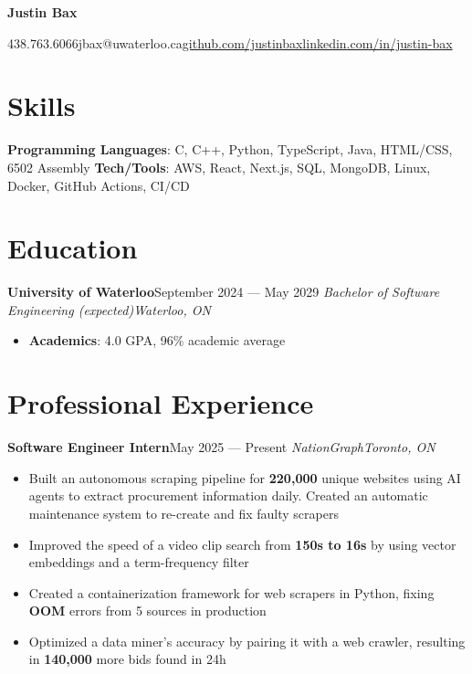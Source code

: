 \documentclass{article}
\newcommand{\cdelim}{\;\textbar\;}
\newcommand{\newrole}[4]{
    {\normalfont\textbf{#1}\hfill#3}
    \newline
    \textit{#2}\hfill\textit{#4}
}
\newenvironment{bulletpoints}{\begin{itemize}\setlength\itemsep{-0.2em}}{\end{itemize}}
\begin{document}
\begin{center}
    {\Huge\bfseries Justin Bax}\\\vspace*{2pt}

    438.763.6066\cdelim jbax@uwaterloo.ca\cdelim\href{https://github.com/justinbax}{github.com/justinbax}\cdelim\href{https://linkedin.com/in/justin-bax}{linkedin.com/in/justin-bax}\\
\end{center}

\section*{Skills}

{\bfseries Programming Languages}: C, C++, Python, TypeScript, Java, HTML/CSS, 6502 Assembly
\newline
{\bfseries Tech/Tools}: AWS, React, Next.js, SQL, MongoDB, Linux, Docker, GitHub Actions, CI/CD


\section*{Education}

\newrole{University of Waterloo}{Bachelor of Software Engineering (expected)}{September 2024 --- May 2029}{Waterloo, ON}
\begin{bulletpoints}
    \vspace*{-2pt}
    \item {\bfseries Academics}: 4.0 GPA, 96\% academic average
\end{bulletpoints}


\section*{Professional Experience}

\newrole{Software Engineer Intern}{NationGraph}{May 2025 --- Present}{Toronto, ON}
\begin{bulletpoints}
    \item Built an autonomous scraping pipeline for \textbf{220,000} unique websites using AI agents to extract procurement information daily. Created an automatic maintenance system to re-create and fix faulty scrapers
    \item Improved the speed of a video clip search from \textbf{150s to 16s} by using vector embeddings and a term-frequency filter
    \item Created a containerization framework for web scrapers in Python, fixing \textbf{OOM} errors from 5 sources in production
    \item Optimized a data miner's accuracy by pairing it with a web crawler, resulting in \textbf{140,000} more bids found in 24h
\end{bulletpoints}
\end{document}
